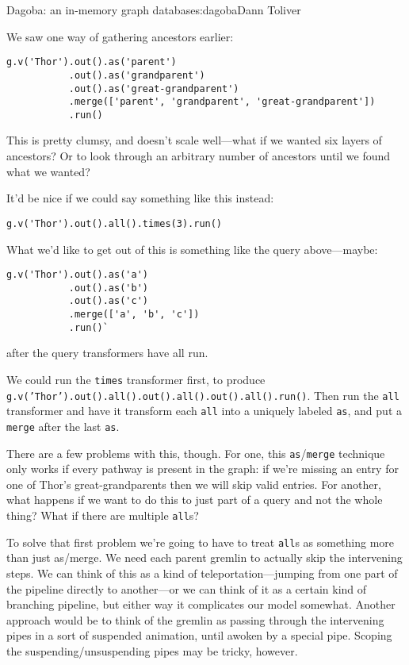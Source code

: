 \begin{aosachapter}{Dagoba: an in-memory graph database}{s:dagoba}{Dann Toliver}
\label{future-directions}

We saw one way of gathering ancestors earlier:

\begin{verbatim}
g.v('Thor').out().as('parent')
           .out().as('grandparent')
           .out().as('great-grandparent')
           .merge(['parent', 'grandparent', 'great-grandparent'])
           .run()
\end{verbatim}

This is pretty clumsy, and doesn't scale well---what if we wanted six
layers of ancestors? Or to look through an arbitrary number of ancestors
until we found what we wanted?

It'd be nice if we could say something like this instead:

\begin{verbatim}
g.v('Thor').out().all().times(3).run()
\end{verbatim}

What we'd like to get out of this is something like the query
above---maybe:

\begin{verbatim}
g.v('Thor').out().as('a')
           .out().as('b')
           .out().as('c')
           .merge(['a', 'b', 'c'])
           .run()`
\end{verbatim}

after the query transformers have all run.

We could run the \texttt{times} transformer first, to produce
\linebreak \texttt{g.v('Thor').out().all().out().all().out().all().run()}.
Then run the \texttt{all} transformer and have it transform each
\texttt{all} into a uniquely labeled \texttt{as}, and put a
\texttt{merge} after the last \texttt{as}.

There are a few problems with this, though. For one, this
\texttt{as}/\texttt{merge} technique only works if every pathway is
present in the graph: if we're missing an entry for one of Thor's
great-grandparents then we will skip valid entries. For another, what
happens if we want to do this to just part of a query and not the whole
thing? What if there are multiple \texttt{all}s?

To solve that first problem we're going to have to treat \texttt{all}s
as something more than just as/merge. We need each parent gremlin to
actually skip the intervening steps. We can think of this as a kind of
teleportation---jumping from one part of the pipeline directly to
another---or we can think of it as a certain kind of branching pipeline,
but either way it complicates our model somewhat. Another approach would
be to think of the gremlin as passing through the intervening pipes in a
sort of suspended animation, until awoken by a special pipe. Scoping the
suspending/unsuspending pipes may be tricky, however.


\end{aosachapter}
